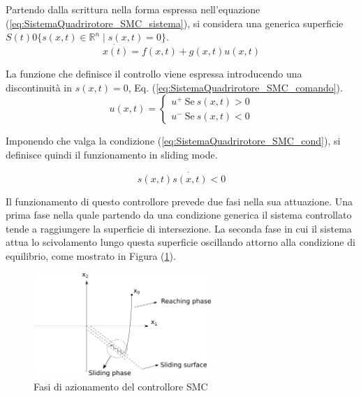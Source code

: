 Partendo dalla scrittura nella forma espressa nell'equazione (\ref{eq:SistemaQuadrirotore_SMC_sistema}), si considera una generica superficie $S(t) 0 \{ s(x,t) \in \mathbb{R}^n  \mid s(x,t) = 0\}$.
\begin{equation}\label{eq:SistemaQuadrirotore_SMC_sistema}
	\dot{x(t)} = f(x,t) +g(x,t) u(x,t)
\end{equation}

La funzione che definisce il controllo viene espressa introducendo una discontinuità in $s(x,t)=0$, Eq. (\ref{eq:SistemaQuadrirotore_SMC_comando}).
\begin{equation}\label{eq:SistemaQuadrirotore_SMC_comando}
	u(x,t) = \begin{cases}
		u^+ \ \text{Se} \ s(x,t) > 0 \\
		u^- \ \text{Se} \ s(x,t) < 0
	\end{cases}
\end{equation}

Imponendo che valga la condizione (\ref{eq:SistemaQuadrirotore_SMC_cond}), si definisce quindi il funzionamento in sliding mode.

\begin{equation}\label{eq:SistemaQuadrirotore_SMC_cond}
	s(x,t) \dot{s(x,t)} < 0
\end{equation}

Il funzionamento di questo controllore prevede due fasi nella sua attuazione. Una prima fase nella quale partendo da una condizione generica il sistema controllato tende a raggiungere la superficie di intersezione. La seconda fase in cui il sistema attua lo scivolamento lungo questa superficie oscillando attorno alla condizione di equilibrio, come mostrato in Figura (\ref{fig:SMC}).

\begin{figure}
	\centering
	\includegraphics[width=0.6\textwidth]{SistemaQuadrirotore/Figure/SMC_fasi}
	\caption{Fasi di azionamento del controllore SMC \cite{LiShihua2017AiVS}}
	\label{fig:SMC}
\end{figure}

